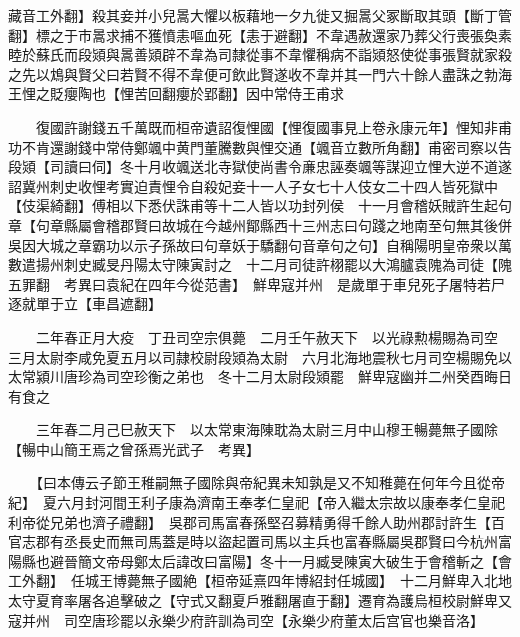 藏音工外翻】殺其妾并小兒暠大懼以板藉地一夕九徙又掘暠父冢斷取其頭【斷丁管翻】標之于市暠求捕不獲憤恚嘔血死【恚于避翻】不韋遇赦還家乃葬父行喪張奐素睦於蘇氏而段熲與暠善熲辟不韋為司隸從事不韋懼稱病不詣熲怒使從事張賢就家殺之先以鴆與賢父曰若賢不得不韋便可飲此賢遂收不韋并其一門六十餘人盡誅之勃海王悝之貶癭陶也【悝苦回翻癭於郢翻】因中常侍王甫求

　　復國許謝錢五千萬既而桓帝遺詔復悝國【悝復國事見上卷永康元年】悝知非甫功不肯還謝錢中常侍鄭颯中黄門董騰數與悝交通【颯音立數所角翻】甫密司察以告段熲【司讀曰伺】冬十月收颯送北寺獄使尚書令亷忠誣奏颯等謀迎立悝大逆不道遂詔冀州刺史收悝考實迫責悝令自殺妃妾十一人子女七十人伎女二十四人皆死獄中【伎渠綺翻】傅相以下悉伏誅甫等十二人皆以功封列侯　十一月會稽妖賊許生起句章【句章縣屬會稽郡賢曰故城在今越州鄮縣西十三州志曰句踐之地南至句無其後併吳因大城之章霸功以示子孫故曰句章妖于驕翻句音章句之句】自稱陽明皇帝衆以萬數遣揚州刺史臧旻丹陽太守陳寅討之　十二月司徒許栩罷以大鴻臚袁隗為司徒【隗五罪翻　考異曰袁紀在四年今從范書】　鮮卑寇并州　是歲單于車兒死子屠特若尸逐就單于立【車昌遮翻】

　　二年春正月大疫　丁丑司空宗俱薨　二月壬午赦天下　以光祿勲楊賜為司空　三月太尉李咸免夏五月以司隷校尉段熲為太尉　六月北海地震秋七月司空楊賜免以太常潁川唐珍為司空珍衡之弟也　冬十二月太尉段熲罷　鮮卑寇幽并二州癸酉晦日有食之

　　三年春二月己巳赦天下　以太常東海陳耽為太尉三月中山穆王暢薨無子國除【暢中山簡王焉之曾孫焉光武子　考異】

　　【曰本傳云子節王稚嗣無子國除與帝紀異未知孰是又不知稚薨在何年今且從帝紀】　夏六月封河間王利子康為濟南王奉孝仁皇祀【帝入繼太宗故以康奉孝仁皇祀利帝從兄弟也濟子禮翻】　吳郡司馬富春孫堅召募精勇得千餘人助州郡討許生【百官志郡有丞長史而無司馬蓋是時以盜起置司馬以主兵也富春縣屬吳郡賢曰今杭州富陽縣也避晉簡文帝母鄭太后諱改曰富陽】冬十一月臧旻陳寅大破生于會稽斬之【會工外翻】　任城王博薨無子國絶【桓帝延熹四年博紹封任城國】　十二月鮮卑入北地太守夏育率屠各追擊破之【守式又翻夏戶雅翻屠直于翻】遷育為護烏桓校尉鮮卑又寇并州　司空唐珍罷以永樂少府許訓為司空【永樂少府董太后宫官也樂音洛】

